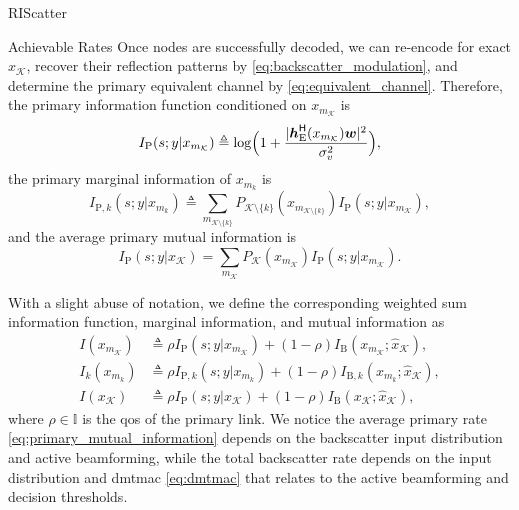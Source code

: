 \documentclass[journal]{IEEEtran}
\begin{document}
\begin{section}{RIScatter}
\begin{subsection}{Achievable Rates}
		Once nodes are successfully decoded, we can re-encode for exact $x_{\mathcal{K}}$, recover their reflection patterns by \eqref{eq:backscatter_modulation}, and determine the primary equivalent channel by \eqref{eq:equivalent_channel}.
		Therefore, the primary information function conditioned on $x_{m_{\mathcal{K}}}$ is
		\begin{equation}
			I_{\text{P}}(s;y|x_{m_{\mathcal{K}}}) \triangleq \log \Bigl(1 + \frac{\lvert \boldsymbol{h}_{\text{E}}^\mathsf{H}(x_{m_{\mathcal{K}}}) \boldsymbol{w} \rvert^2}{\sigma_v^2}\Bigr),
			\label{eq:primary_information_function}
		\end{equation}
		the primary marginal information of $x_{m_k}$ is
		\begin{equation}
			I_{\text{P},k}(s;y|x_{m_k}) \triangleq \sum_{m_{\mathcal{K} \setminus \{k\}}} P_{\mathcal{K} \setminus \{k\}}(x_{m_{\mathcal{K} \setminus \{k\}}}) I_{\text{P}}(s;y|x_{m_{\mathcal{K}}}),
			\label{eq:primary_marginal_information}
		\end{equation}
		and the average primary mutual information is
		\begin{equation}
			I_{\text{P}}(s;y|x_{\mathcal{K}}) = \sum_{m_{\mathcal{K}}} P_{\mathcal{K}}(x_{m_{\mathcal{K}}}) I_{\text{P}}(s;y|x_{m_{\mathcal{K}}}).
			\label{eq:primary_mutual_information}
		\end{equation}

		With a slight abuse of notation, we define the corresponding weighted sum information function, marginal information, and mutual information as
		\begin{align}
			I(x_{m_{\mathcal{K}}})
			 & \triangleq \rho I_{\text{P}}(s;y|x_{m_{\mathcal{K}}}) + (1 - \rho) I_{\text{B}}(x_{m_{\mathcal{K}}};\hat{x}_{\mathcal{K}}),\label{eq:weighted_sum_information_function} \\
			I_k(x_{m_k})
			 & \triangleq \rho I_{\text{P},k}(s;y|x_{m_k}) + (1 - \rho) I_{\text{B},k}(x_{m_k};\hat{x}_{\mathcal{K}}),\label{eq:weighted_sum_marginal_information}                     \\
			I(x_{\mathcal{K}})
			 & \triangleq \rho I_{\text{P}}(s;y|x_{\mathcal{K}}) + (1 - \rho) I_{\text{B}}(x_{\mathcal{K}};\hat{x}_{\mathcal{K}}),\label{eq:weighted_sum_mutual_information}
		\end{align}
		where $\rho \in \mathbb{I}$ is the \gls{qos} of the primary link.
		We notice the average primary rate \eqref{eq:primary_mutual_information} depends on the backscatter input distribution and active beamforming, while the total backscatter rate depends on the input distribution and \gls{dmtmac} \eqref{eq:dmtmac} that relates to the active beamforming and decision thresholds.
		\label{st:information_theory}
	\end{subsection}
	\label{st:riscatter}
\end{section}
\end{document}
